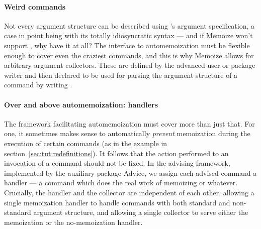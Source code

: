 \documentclass[a4paper,11pt]{article}
\begin{document}
\paragraph{Weird commands}
Not every argument structure can be described using 's argument
specification, a case in point being  with its totally
idiosyncratic syntax --- and if Memoize won't support , why have it at
all?  The interface to automemoization must be flexible enough to cover even
the craziest commands, and this is why Memoize allows for arbitrary argument
collectors.  These are defined by the advanced user or package writer and then
declared to be used for parsing the argument structure of a command by writing
.

\paragraph{Over and above automemoization: handlers}
The framework facilitating automemoization must cover more than just that.  For
one, it sometimes makes sense to automatically \emph{prevent} memoization
during the execution of certain commands (as in the 
example in section~\ref{sec:tut:redefinitions}).  It follows that the action
performed to an invocation of a command should not be fixed.  In the advising
framework, implemented by the auxiliary package Advice, we assign each
advised command a handler --- a command which does the real work of
memoizing or whatever.  Crucially, the handler and the collector are
independent of each other, allowing a single memoization handler to handle
commands with both standard and non-standard argument structure, and allowing a
single collector to serve either the memoization or the no-memoization handler.
\end{document}
